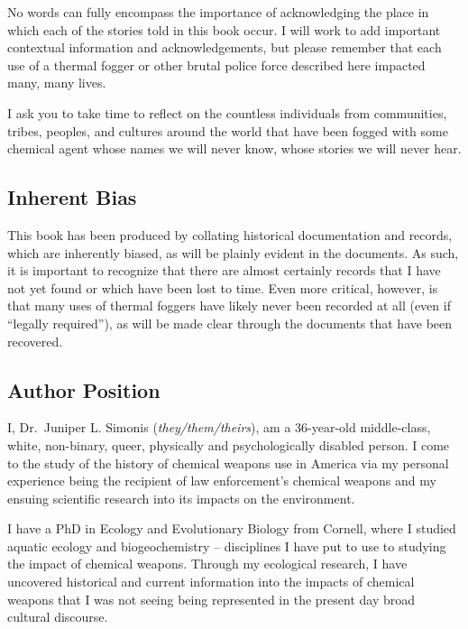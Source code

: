 \documentclass[
  12pt,
]{krantz}
\begin{document}
No words can fully encompass the importance of acknowledging the place in which each of the stories told in this book occur.
I will work to add important contextual information and acknowledgements, but please remember that each use of a thermal fogger or other brutal police force described here impacted many, many lives.

I ask you to take time to reflect on the countless individuals from communities, tribes, peoples, and cultures around the world that have been fogged with some chemical agent whose names we will never know, whose stories we will never hear.

\hypertarget{inherent-bias}{%
\subsection*{Inherent Bias}\label{inherent-bias}}


This book has been produced by collating historical documentation and records, which are inherently biased, as will be plainly evident in the documents.
As such, it is important to recognize that there are almost certainly records that I have not yet found or which have been lost to time.
Even more critical, however, is that many uses of thermal foggers have likely never been recorded at all (even if ``legally required''), as will be made clear through the documents that have been recovered.

\hypertarget{author-position}{%
\subsection*{Author Position}\label{author-position}}


I, Dr.~Juniper L. Simonis (\emph{they/them/theirs}), am a 36-year-old middle-class, white, non-binary, queer, physically and psychologically disabled person.
I come to the study of the history of chemical weapons use in America via my personal experience being the recipient of law enforcement's chemical weapons and my ensuing scientific research into its impacts on the environment.

I have a PhD in Ecology and Evolutionary Biology from Cornell, where I studied aquatic ecology and biogeochemistry -- disciplines I have put to use to studying the impact of chemical weapons.
Through my ecological research, I have uncovered historical and current information into the impacts of chemical weapons that I was not seeing being represented in the present day broad cultural discourse.
\end{document}
